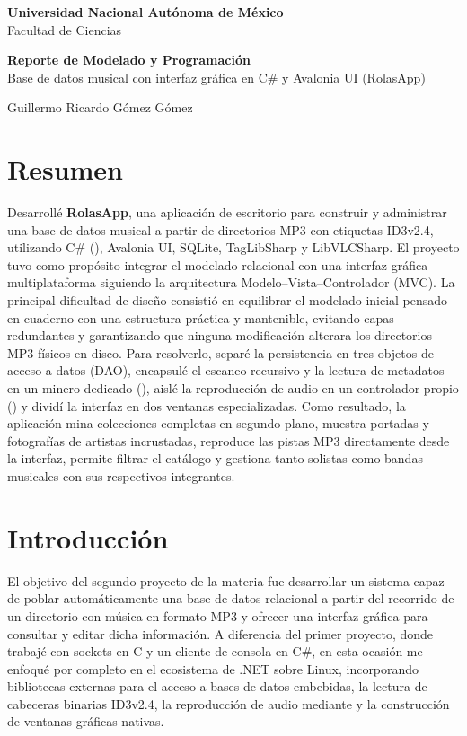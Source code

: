 \documentclass[11pt,letterpaper]{article}
\newcommand{\archivo}[1]{\texttt{\detokenize{#1}}}
\begin{document}
\begin{center}
    \textbf{Universidad Nacional Autónoma de México}\\
    Facultad de Ciencias

    \textbf{Reporte de Modelado y Programación}\\
    Base de datos musical con interfaz gráfica en C\# y Avalonia UI (RolasApp)

    Guillermo Ricardo Gómez Gómez
\end{center}

\section{Resumen}

Desarrollé \textbf{RolasApp}, una aplicación de escritorio para construir y
administrar una base de datos musical a partir de directorios MP3 con
etiquetas ID3v2.4, utilizando C\# (\archivo{net10.0}), Avalonia UI, SQLite,
TagLibSharp y LibVLCSharp. El proyecto tuvo como propósito integrar el
modelado relacional con una interfaz gráfica multiplataforma siguiendo la
arquitectura Modelo--Vista--Controlador (MVC). La principal dificultad
de diseño consistió en equilibrar el modelado inicial pensado en cuaderno
con una estructura práctica y mantenible, evitando capas redundantes y
garantizando que ninguna modificación alterara los directorios MP3 físicos
en disco. Para resolverlo, separé la persistencia en tres objetos de
acceso a datos (DAO), encapsulé el escaneo recursivo y la lectura de
metadatos en un minero dedicado (\archivo{Steve}), aislé la reproducción
de audio en un controlador propio (\archivo{ControladorReproductor}) y
dividí la interfaz en dos ventanas especializadas. Como resultado, la
aplicación mina colecciones completas en segundo plano, muestra portadas y
fotografías de artistas incrustadas, reproduce las pistas MP3 directamente
desde la interfaz, permite filtrar el catálogo y gestiona tanto solistas
como bandas musicales con sus respectivos integrantes.

\section{Introducción}

El objetivo del segundo proyecto de la materia fue desarrollar un
sistema capaz de poblar automáticamente una base de datos relacional
a partir del recorrido de un directorio con música en formato MP3 y
ofrecer una interfaz gráfica para consultar y editar dicha información.
A diferencia del primer proyecto, donde trabajé con sockets en C y un
cliente de consola en C\#, en esta ocasión me enfoqué por completo en el
ecosistema de .NET sobre Linux, incorporando bibliotecas externas para
el acceso a bases de datos embebidas, la lectura de cabeceras binarias
ID3v2.4, la reproducción de audio mediante \archivo{libvlc} y la
construcción de ventanas gráficas nativas.
\end{document}
